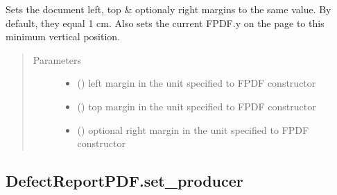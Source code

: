 \documentclass[letterpaper,10pt,english]{sphinxmanual}
\begin{document}
\begin{fulllineitems}
\begin{fulllineitems}
\label{\detokenize{generated/quality_assessment.quality_pdf_report.DefectReportPDF.set_margins:quality_assessment.quality_pdf_report.DefectReportPDF.set_margins}}
\sphinxAtStartPar
Sets the document left, top \& optionaly right margins to the same value.
By default, they equal 1 cm.
Also sets the current FPDF.y on the page to this minimum vertical position.
\begin{quote}\begin{description}
\item[{Parameters}] \leavevmode\begin{itemize}
\item {} 
\sphinxAtStartPar
{} () \textendash{} left margin in the unit specified to FPDF constructor

\item {} 
\sphinxAtStartPar
{} () \textendash{} top margin in the unit specified to FPDF constructor

\item {} 
\sphinxAtStartPar
{} () \textendash{} optional right margin in the unit specified to FPDF constructor

\end{itemize}

\end{description}\end{quote}

\end{fulllineitems}



\subsection{DefectReportPDF.set\_producer}
\label{\detokenize{generated/quality_assessment.quality_pdf_report.DefectReportPDF.set_producer:defectreportpdf-set-producer}}\label{\detokenize{generated/quality_assessment.quality_pdf_report.DefectReportPDF.set_producer::doc}}


\end{fulllineitems}
\end{document}
